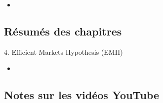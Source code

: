 \begin{YTB_vids}
\begin{itemize}
	\item	
\end{itemize}
\end{YTB_vids}

\subsection{Résumés des chapitres}

\begin{CHPT_SUMM_AUTO}[label = {L.-4}]{4. Efficient Markets Hypothesis (EMH)}
	\begin{itemize}
		\item	
	\end{itemize}
\end{CHPT_SUMM_AUTO}

\subsection{Notes sur les vidéos YouTube}

